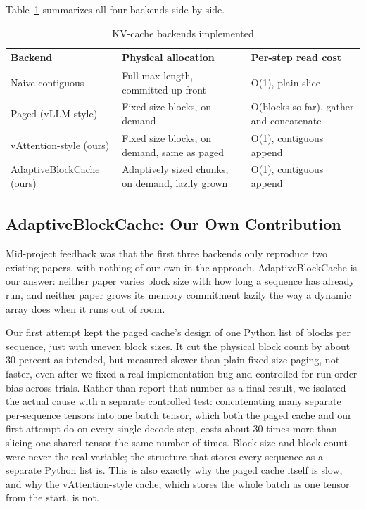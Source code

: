 \documentclass[lettersize,journal]{IEEEtran}
\begin{document}
Table~\ref{tab:backends} summarizes all four backends side by side.

\begin{table}[!t]
\caption{KV-cache backends implemented}
\label{tab:backends}
\centering
\begin{tabularx}{\textwidth}{@{}lXX@{}}
\toprule
\textbf{Backend} & \textbf{Physical allocation} & \textbf{Per-step read cost} \\
\midrule
Naive contiguous & Full max length, committed up front & O(1), plain slice \\
Paged (vLLM-style) & Fixed size blocks, on demand & O(blocks so far), gather and concatenate \\
vAttention-style (ours) & Fixed size blocks, on demand, same as paged & O(1), contiguous append \\
AdaptiveBlockCache (ours) & Adaptively sized chunks, on demand, lazily grown & O(1), contiguous append \\
\bottomrule
\end{tabularx}
\end{table}

\subsection{AdaptiveBlockCache: Our Own Contribution}
\label{sec:adaptive}

Mid-project feedback was that the first three backends only reproduce two existing papers, with nothing of our own in the approach. AdaptiveBlockCache is our answer: neither paper varies block size with how long a sequence has already run, and neither paper grows its memory commitment lazily the way a dynamic array does when it runs out of room.

Our first attempt kept the paged cache's design of one Python list of blocks per sequence, just with uneven block sizes. It cut the physical block count by about 30 percent as intended, but measured slower than plain fixed size paging, not faster, even after we fixed a real implementation bug and controlled for run order bias across trials. Rather than report that number as a final result, we isolated the actual cause with a separate controlled test: concatenating many separate per-sequence tensors into one batch tensor, which both the paged cache and our first attempt do on every single decode step, costs about 30 times more than slicing one shared tensor the same number of times. Block size and block count were never the real variable; the structure that stores every sequence as a separate Python list is. This is also exactly why the paged cache itself is slow, and why the vAttention-style cache, which stores the whole batch as one tensor from the start, is not.
\end{document}

